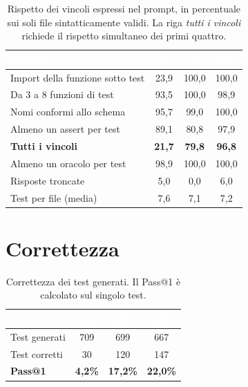 \begin{table}[H]
\centering
\caption{Rispetto dei vincoli espressi nel prompt, in percentuale sui soli file
sintatticamente validi. La riga \emph{tutti i vincoli} richiede il rispetto
simultaneo dei primi quattro.}
\label{tab:formato}
\begin{tabular}{lccc}
\hline
\rowcolor{intest}
\textcolor{white}{\textbf{Vincolo}} & \textcolor{white}{\textbf{1B}} &
\textcolor{white}{\textbf{3B}} & \textcolor{white}{\textbf{8B}} \\
\hline
Import della funzione sotto test & 23,9 & 100,0 & 100,0 \\
Da 3 a 8 funzioni di test        & 93,5 & 100,0 &  98,9 \\
Nomi conformi allo schema        & 95,7 &  99,0 & 100,0 \\
Almeno un assert per test        & 89,1 &  80,8 &  97,9 \\
\hline
\rowcolor{accento}
\textbf{Tutti i vincoli}         & \textbf{21,7} & \textbf{79,8} & \textbf{96,8} \\
\hline
Almeno un oracolo per test       & 98,9 & 100,0 & 100,0 \\
Risposte troncate                &  5,0 &   0,0 &   6,0 \\
Test per file (media)            &  7,6 &   7,1 &   7,2 \\
\hline
\end{tabular}
\end{table}


\section{Correttezza}
\label{sec:ris-correttezza}
%
%
%
%


\begin{table}[H]
\centering
\caption{Correttezza dei test generati. Il Pass@1 è calcolato sul singolo test.}
\label{tab:correttezza}
\begin{tabular}{lccc}
\hline
\rowcolor{intest}
& \textcolor{white}{\textbf{1B}} & \textcolor{white}{\textbf{3B}} &
\textcolor{white}{\textbf{8B}} \\
\hline
Test generati        & 709 & 699 & 667 \\
Test corretti        &  30 & 120 & 147 \\
\hline
\rowcolor{accento}
\textbf{Pass@1}      & \textbf{4,2\%} & \textbf{17,2\%} & \textbf{22,0\%} \\
\hline
\end{tabular}
\end{table}


